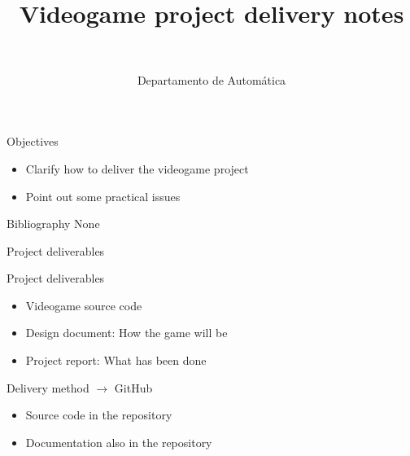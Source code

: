 \documentclass[10pt,compress]{beamer} %
\title[Videogame delivery notes]{Videogame project delivery notes}
\author{\asignatura\\\carrera}
\institute{}
\date{Departamento de Automática}
\begin{document}
{\titlepageBlue
    \begin{frame}
        \titlepage
    \end{frame}
}

\begin{frame}[plain]{}
   \begin{block}{Objectives}
   \begin{itemize}
        \item Clarify how to deliver the videogame project
		\item Point out some practical issues
	\end{itemize}
	\end{block}

   \begin{block}{Bibliography}
   		None
   \end{block}
\end{frame}



\begin{frame}{Project deliverables}
	\begin{block}{Project deliverables}
	\begin{itemize}
	\item Videogame source code
	\item Design document: How the game will be
	\item Project report: What has been done
	\end{itemize}
	\end{block}

	\bigskip
	
	Delivery method $\rightarrow$ GitHub
	\begin{itemize}
	\item Source code in the repository
	\item Documentation also in the repository
	\end{itemize}
\end{frame}
\end{document}

